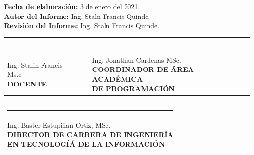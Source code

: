\documentclass[a4pa<per,12pt,spanish]{article}
\begin{document}


\setlength{\bibleftmargin}{.125in}
\setlength{\bibindent}{-\bibleftmargin}


\newpage
\vspace{0.3cm}


\noindent \textbf{Fecha de elaboración:} 3 de enero del 2021. \\
\textbf{Autor del Informe: } Ing. Staln Francis Quinde. \\
\textbf{Revisión del Informe: } Ing. Staln Francis Quinde. \\

\vspace{4cm}

\vspace{3cm}
\begin{center}
\begin{tabular}[H]{m{8cm}lm{8cm}}
  \rule{7cm}{0.4pt}& &\rule{7cm}{0.4pt} \\
  \makecell[c]{Ing. Stalin Francis Ms.c\\\textbf{ DOCENTE}}  & &\makecell[c]{Ing. Jonathan Cardenas  MSc. \\ \textbf{COORDINADOR DE ÁREA ACADÉMICA} \\ \textbf{DE PROGRAMACIÓN}} \\ 
\end{tabular}
\end{center}

\vspace{3cm}
\begin{center}

\begin{tabular}[H]{m{8cm}lm{8cm}}
  
  \rule{7cm}{0.4pt}&  & \\
  \makecell[c]{Ing. Baster Estupiñan Ortiz, MSc. \\ \textbf{DIRECTOR DE CARRERA DE INGENIERÍA} \\ \textbf{EN TECNOLOGÍÁ DE LA INFORMACIÓN}} & &  
\end{tabular}
\end{center}
\end{document}

